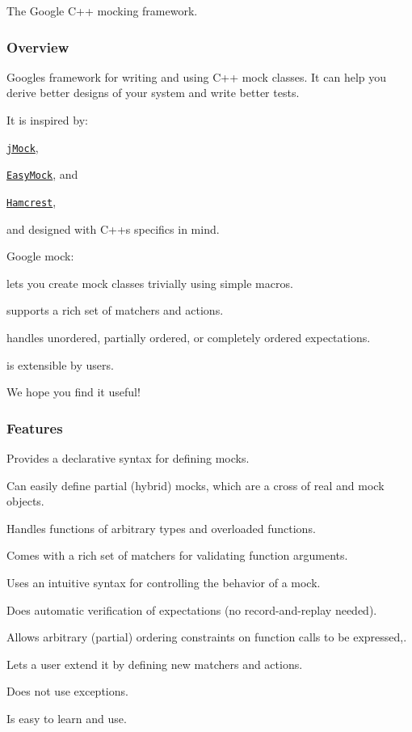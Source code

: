 The Google C++ mocking framework.

\subsubsection*{Overview}

Google\textquotesingle{}s framework for writing and using C++ mock classes. It can help you derive better designs of your system and write better tests.

It is inspired by\+:


\begin{DoxyItemize}
\item \href{http://www.jmock.org/}{\tt j\+Mock},
\item \href{http://www.easymock.org/}{\tt Easy\+Mock}, and
\item \href{http://code.google.com/p/hamcrest/}{\tt Hamcrest},
\end{DoxyItemize}

and designed with C++\textquotesingle{}s specifics in mind.

Google mock\+:


\begin{DoxyItemize}
\item lets you create mock classes trivially using simple macros.
\item supports a rich set of matchers and actions.
\item handles unordered, partially ordered, or completely ordered expectations.
\item is extensible by users.
\end{DoxyItemize}

We hope you find it useful!

\subsubsection*{Features}


\begin{DoxyItemize}
\item Provides a declarative syntax for defining mocks.
\item Can easily define partial (hybrid) mocks, which are a cross of real and mock objects.
\item Handles functions of arbitrary types and overloaded functions.
\item Comes with a rich set of matchers for validating function arguments.
\item Uses an intuitive syntax for controlling the behavior of a mock.
\item Does automatic verification of expectations (no record-\/and-\/replay needed).
\item Allows arbitrary (partial) ordering constraints on function calls to be expressed,.
\item Lets a user extend it by defining new matchers and actions.
\item Does not use exceptions.
\item Is easy to learn and use.
\end{DoxyItemize}

